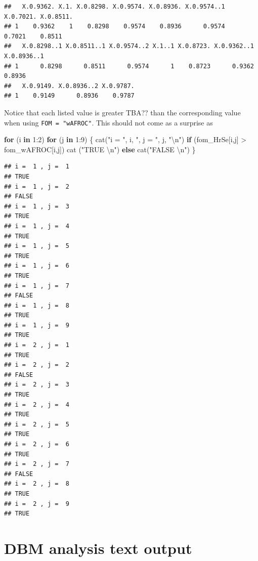 \documentclass[
]{book}
\newenvironment{Shaded}{\begin{snugshade}}{\end{snugshade}}
\newcommand{\ControlFlowTok}[1]{\textcolor[rgb]{0.13,0.29,0.53}{\textbf{#1}}}
\newcommand{\DecValTok}[1]{\textcolor[rgb]{0.00,0.00,0.81}{#1}}
\newcommand{\FunctionTok}[1]{\textcolor[rgb]{0.00,0.00,0.00}{#1}}
\newcommand{\NormalTok}[1]{#1}
\newcommand{\SpecialCharTok}[1]{\textcolor[rgb]{0.00,0.00,0.00}{#1}}
\newcommand{\StringTok}[1]{\textcolor[rgb]{0.31,0.60,0.02}{#1}}
\begin{document}
\begin{verbatim}
##   X.0.9362. X.1. X.0.8298. X.0.9574. X.0.8936. X.0.9574..1 X.0.7021. X.0.8511.
## 1    0.9362    1    0.8298    0.9574    0.8936      0.9574    0.7021    0.8511
##   X.0.8298..1 X.0.8511..1 X.0.9574..2 X.1..1 X.0.8723. X.0.9362..1 X.0.8936..1
## 1      0.8298      0.8511      0.9574      1    0.8723      0.9362      0.8936
##   X.0.9149. X.0.8936..2 X.0.9787.
## 1    0.9149      0.8936    0.9787
\end{verbatim}

Notice that each listed value is greater TBA?? than the corresponding value when using \texttt{FOM\ =\ "wAFROC"}. This should not come as a surprise as

\begin{Shaded}
\begin{Highlighting}[]
\ControlFlowTok{for}\NormalTok{ (i }\ControlFlowTok{in} \DecValTok{1}\SpecialCharTok{:}\DecValTok{2}\NormalTok{)}
    \ControlFlowTok{for}\NormalTok{ (j }\ControlFlowTok{in} \DecValTok{1}\SpecialCharTok{:}\DecValTok{9}\NormalTok{) \{}
        \FunctionTok{cat}\NormalTok{(}\StringTok{"i = "}\NormalTok{, i, }\StringTok{", j = "}\NormalTok{, j, }\StringTok{"}\SpecialCharTok{\textbackslash{}n}\StringTok{"}\NormalTok{)}
        \ControlFlowTok{if}\NormalTok{ (fom\_HrSe[i,j] }\SpecialCharTok{\textgreater{}}\NormalTok{ fom\_wAFROC[i,j]) }\FunctionTok{cat}\NormalTok{ (}\StringTok{"TRUE }\SpecialCharTok{\textbackslash{}n}\StringTok{"}\NormalTok{) }\ControlFlowTok{else} \FunctionTok{cat}\NormalTok{(}\StringTok{"FALSE }\SpecialCharTok{\textbackslash{}n}\StringTok{"}\NormalTok{) }
\NormalTok{\}}
\end{Highlighting}
\end{Shaded}

\begin{verbatim}
## i =  1 , j =  1 
## TRUE 
## i =  1 , j =  2 
## FALSE 
## i =  1 , j =  3 
## TRUE 
## i =  1 , j =  4 
## TRUE 
## i =  1 , j =  5 
## TRUE 
## i =  1 , j =  6 
## TRUE 
## i =  1 , j =  7 
## FALSE 
## i =  1 , j =  8 
## TRUE 
## i =  1 , j =  9 
## TRUE 
## i =  2 , j =  1 
## TRUE 
## i =  2 , j =  2 
## FALSE 
## i =  2 , j =  3 
## TRUE 
## i =  2 , j =  4 
## TRUE 
## i =  2 , j =  5 
## TRUE 
## i =  2 , j =  6 
## TRUE 
## i =  2 , j =  7 
## FALSE 
## i =  2 , j =  8 
## TRUE 
## i =  2 , j =  9 
## TRUE
\end{verbatim}

\hypertarget{quick-start-dbm-text}{%
\chapter{DBM analysis text output}\label{quick-start-dbm-text}}
\end{document}
